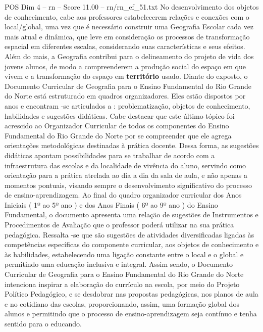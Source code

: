 \begin{textsample}{POS Dim 4 – rn – Score 11.00 – rn/rn\_ef\_51.txt}
No desenvolvimento dos objetos de conhecimento, cabe aos professores estabelecerem relações e conexões com o local/global, uma vez que é necessário construir uma Geografia Escolar cada vez mais atual e dinâmica, que leve em consideração os processos de transformação espacial em diferentes escalas, considerando suas características e seus efeitos.
Além do mais, a Geografia contribui para o delineamento do projeto de vida dos jovens alunos, de modo a compreenderem a produção social do espaço em que vivem e a transformação do espaço em \textbf{território} usado.
Diante do exposto, o Documento Curricular de Geografia para o Ensino Fundamental do Rio Grande do Norte está estruturado em quadros organizadores.
Eles estão dispostos por anos e encontram -se articulados a : problematização, objetos de conhecimento, habilidades e sugestões didáticas.
Cabe destacar que este último tópico foi acrescido ao Organizador Curricular de todos os componentes do Ensino Fundamental do Rio Grande do Norte por se compreender que ele agrega orientações metodológicas destinadas à prática docente.
Dessa forma, as sugestões didáticas apontam possibilidades para se trabalhar de acordo com a infraestrutura das escolas e da localidade de vivência do aluno, servindo como orientação para a prática atrelada ao dia a dia da sala de aula, e não apenas a momentos pontuais, visando sempre o desenvolvimento significativo do processo de ensino-aprendizagem.
Ao final do quadro organizador curricular dos Anos Iniciais ( 1º ao 5º ano ) e dos Anos Finais ( 6º ao 9º ano ) do Ensino Fundamental, o documento apresenta uma relação de sugestões de Instrumentos e Procedimentos de Avaliação que o professor poderá utilizar na sua prática pedagógica.
Ressalta -se que são sugestões de atividades diversificadas ligadas às competências específicas do componente curricular, aos objetos de conhecimento e às habilidades, estabelecendo uma ligação constante entre o local e o global e permitindo uma educação inclusiva e integral.
Assim sendo, o Documento Curricular de Geografia para o Ensino Fundamental do Rio Grande do Norte intenciona inspirar a elaboração do currículo na escola, por meio do Projeto Político Pedagógico, e se desdobrar nas propostas pedagógicas, nos planos de aula e no cotidiano das escolas, proporcionando, assim, uma formação global dos alunos e permitindo que o processo de ensino-aprendizagem seja contínuo e tenha sentido para o educando.

\end{textsample}
